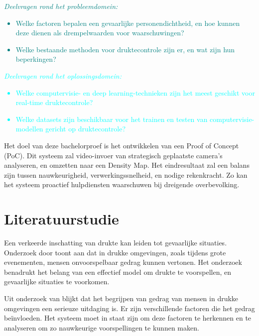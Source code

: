 \textcolor{teal}{
\textit{Deelvragen rond het probleemdomein:}
\begin{itemize}
    \item Welke factoren bepalen een gevaarlijke per\-so\-nen\-dicht\-heid, en hoe kunnen deze dienen als drempelwaarden voor waarschuwingen?
    \item Welke bestaande methoden voor druktecontrole zijn er, en wat zijn hun beperkingen?
\end{itemize}
}

\textcolor{cyan}{
\textit{Deelvragen rond het oplossingsdomein:}
\begin{itemize}
    \item Welke computervisie- en deep learning-tech\-nie\-ken zijn het meest geschikt voor real-time druktecontrole?
    \item Welke datasets zijn beschikbaar voor het trainen en testen van computervisie-modellen gericht op druktecontrole?
\end{itemize}
}

Het doel van deze bachelorproef is het ontwikkelen van een Proof of Concept (PoC). Dit systeem zal video-invoer van strategisch geplaatste camera's analyseren, en omzetten naar een Density Map. Het eindresultaat zal een balans zijn tussen nauwkeurigheid, verwerkingssnelheid, en nodige rekenkracht. Zo kan het systeem proactief hulpdiensten waarschuwen bij dreigende overbevolking.


\section{Literatuurstudie}%
\label{sec:literatuurstudie}

Een verkeerde inschatting van drukte kan leiden tot gevaarlijke situaties. Onderzoek door \textcite{Helbing2000} toont aan dat in drukke omgevingen, zoals tijdens grote evenementen, mensen onvoorspelbaar gedrag kunnen vertonen. Het onderzoek benadrukt het belang van een effectief model om drukte te voorspellen, en gevaarlijke situaties te voorkomen.

Uit onderzoek van \textcite{Zeitz2009} blijkt dat het begrijpen van gedrag van mensen in drukke omgevingen een serieuze uitdaging is. Er zijn verschillende factoren die het gedrag beïnvloeden. Het systeem moet in staat zijn om deze factoren te herkennen en te analyseren om zo nauwkeurige voorspellingen te kunnen maken.

